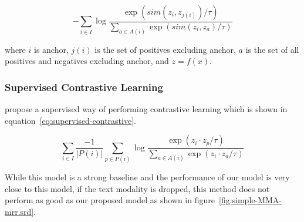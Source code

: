 \documentclass[sigconf,natbib=true,anonymous=true]{acmart}
\begin{document}
\begin{equation}\label{eq:contrastive-loss}
    -\sum_{i \in I} \log \frac{\exp (sim(z_i , z_{j(i)}) / \tau) }{\sum_{a \in A(i)} \exp (sim(z_i, z_a) / \tau)}
\end{equation}

where $i$ is anchor, $j(i)$ is the set of positives excluding anchor, $a$ is the set of all positives and negatives excluding anchor, and $z = f(x)$.

\subsubsection{Supervised Contrastive Learning}
\label{sub:baseline-supcon}

\citet{NEURIPS2020_supervised_contrastive} propose a supervised way of performing contrastive learning which is shown in equation~\ref{eq:supervised-contrastive}.

\begin{equation}\label{eq:supervised-contrastive}
    \sum_{i \in I} \frac{-1}{|P(i)|} \sum_{p \in P(i)} \log \frac{\exp (z_i \cdot z_p / \tau) }{\sum_{a \in A(i)} \exp (z_i \cdot z_a / \tau)}
\end{equation}



While this model is a strong baseline and the performance of our model is very close to this model, if the text modality is dropped, this method does not perform as good as our proposed model as shown in figure~\ref{fig:simple-MMA-mrr.srd}.
\end{document}
